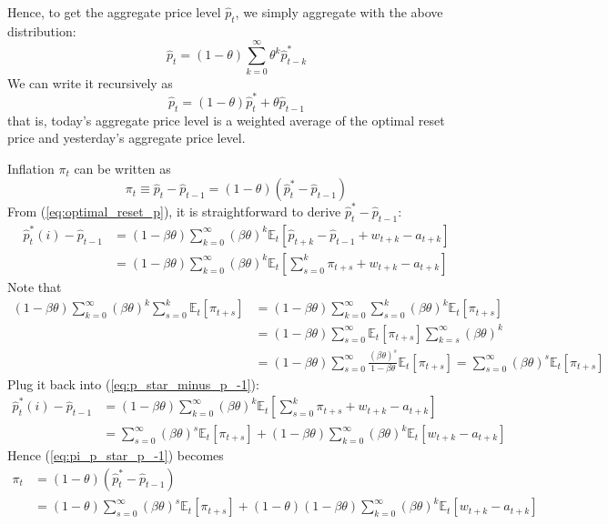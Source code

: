 \documentclass[12pt]{article}
\newcommand{\E}{\mathbb{E}}
\begin{document}
Hence, to get the aggregate price level $\hat{p}_t$, we simply aggregate with the above distribution:
\begin{equation}
	\hat{p}_t = (1-\theta) \sum_{k=0}^\infty \theta^k \hat{p}_{t-k}^*
\end{equation}
We can write it recursively as
\begin{equation}
	\hat{p}_t = (1-\theta) \hat{p}_t^* + \theta \hat{p}_{t-1}
\end{equation}
that is, today's aggregate price level is a weighted average of the optimal reset price and yesterday's aggregate price level.

Inflation $\pi_t$ can be written as
\begin{equation} \label{eq:pi_p_star_p_-1}
	\pi_t \equiv \hat{p}_t - \hat{p}_{t-1} = (1-\theta) (\hat{p}_t^* - \hat{p}_{t-1})
\end{equation}
From (\ref{eq:optimal_reset_p}), it is straightforward to derive $\hat{p}_t^* - \hat{p}_{t-1}$:
\begin{align} 
	\hat{p}_t^*(i) - \hat{p}_{t-1} & = (1-\beta \theta) \sum_{k=0}^\infty (\beta \theta)^k \E_t \left[\hat{p}_{t+k} - \hat{p}_{t-1} + w_{t+k} - a_{t+k}\right] \nonumber \\
	& = (1-\beta \theta) \sum_{k=0}^\infty (\beta \theta)^k \E_t \left[\sum_{s=0}^k \pi_{t+s} + w_{t+k} - a_{t+k}\right] \label{eq:p_star_minus_p_-1}
\end{align}
Note that
\begin{align*}
	(1-\beta \theta) \sum_{k=0}^\infty (\beta \theta)^k \sum_{s=0}^k\E_t \left[\pi_{t+s}\right] & = (1-\beta \theta) \sum_{k=0}^\infty \sum_{s=0}^k (\beta \theta)^k \E_t \left[\pi_{t+s}\right] \\
	& = (1-\beta \theta) \sum_{s=0}^\infty \E_t[\pi_{t+s}] \sum_{k=s}^\infty (\beta \theta)^k \\
	& = (1-\beta \theta) \sum_{s=0}^\infty \frac{(\beta \theta)^s}{1-\beta \theta} \E_t[\pi_{t+s}] = \sum_{s=0}^\infty (\beta \theta)^s \E_t[\pi_{t+s}]
\end{align*}
Plug it back into (\ref{eq:p_star_minus_p_-1}):
\begin{align}
	\hat{p}_t^*(i) - \hat{p}_{t-1} & = (1-\beta \theta) \sum_{k=0}^\infty (\beta \theta)^k \E_t \left[\sum_{s=0}^k \pi_{t+s} + w_{t+k} - a_{t+k}\right] \nonumber \\
	& = \sum_{s=0}^\infty (\beta \theta)^s \E_t[\pi_{t+s}] + (1-\beta \theta) \sum_{k=0}^\infty (\beta \theta)^k \E_t\left[w_{t+k} - a_{t+k}\right] \nonumber
\end{align}
Hence (\ref{eq:pi_p_star_p_-1}) becomes
\begin{align}
	\pi_t &= (1-\theta) (\hat{p}_t^* - \hat{p}_{t-1}) \nonumber \\
	& = (1-\theta)\sum_{s=0}^\infty (\beta \theta)^s \E_t[\pi_{t+s}] + (1-\theta) (1-\beta \theta) \sum_{k=0}^\infty (\beta \theta)^k \E_t\left[w_{t+k} - a_{t+k}\right] \label{eq:NKPC_infinite_regress}
\end{align}
\end{document}
